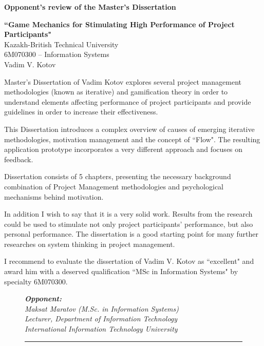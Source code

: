 \begin{titlepage}
\begin{centering}
       \vspace{14pt}

		{\bf
		Opponent's review of the Master's Dissertation\\
		}

		\vspace{14pt}
		
		{\bf``Game Mechanics for Stimulating High Performance of Project Participants"}\\
		{\small Kazakh-British Technical University\\
		6M070300 -- Information Systems\\
		Vadim V. Kotov\\}
		
		\vspace{14pt}
		
	\end{centering}
    
    Master's Dissertation of Vadim Kotov explores several project management methodologies (known as iterative) and gamification theory in order to understand elements affecting performance of project participants and provide guidelines in order to increase their effectiveness.
    
    This Dissertation introduces a complex overview of causes of emerging iterative methodologies, motivation management and the concept of ``Flow". The resulting application prototype incorporates a very different approach and focuses on feedback.
    
    Dissertation consists of 5 chapters, presenting the necessary background combination of Project Management methodologies and psychological mechanisms behind motivation.
    
    In addition I wish to say that it is a very solid work. Results from the research could be used to stimulate not only project participants' performance, but also personal performance. The dissertation is a good starting point for many further researches on system thinking in project management.
    
    I recommend to evaluate the dissertation of Vadim V. Kotov as ``excellent" and award him with a deserved qualification ``MSc in Information Systems" by specialty 6M070300.

		\begin{figure}[ht]
			\begin{minipage}[t]{0.7\linewidth}{\em \small
				{\bf Opponent: }\\
				Maksat Maratov (M.Sc. in Information Systems)\\
				Lecturer, Department of Information Technology\\
				International Information Technology University
				\vspace{14pt}
				
				\rule{13em}{0.4pt}\\
				}
			\end{minipage}
		\end{figure}
		
	\end{titlepage}